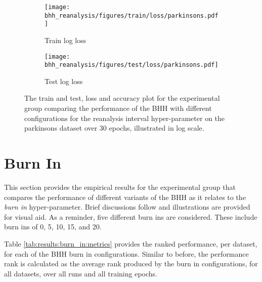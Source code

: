\begin{figure}[H]
	\begin{subfigure}{0.5\textwidth}
		\centering
		\texttt{[image: bhh\_reanalysis/figures/train/loss/parkinsons.pdf]}
		\caption{Train log loss}
		\label{fig:results:reanalysis:figures:loss:train:parkinsons}
	\end{subfigure}
	\begin{subfigure}{0.5\textwidth}
		\centering
		\texttt{[image: bhh\_reanalysis/figures/test/loss/parkinsons.pdf]}
		\caption{Test log loss}
		\label{fig:results:reanalysis:figures:loss:test:parkinsons}
	\end{subfigure}
	\par\bigskip
	\caption{The train and test, loss and accuracy plot for the experimental group comparing the performance of the \acs{BHH} with different configurations for the reanalysis interval hyper-parameter on the parkinsons dataset over 30 epochs, illustrated in log scale.}
	\label{fig:results:reanalysis:figures:parkinsons}
\end{figure}


\section{Burn In}\label{sec:results:burn_in}

This section provides the empirical results for the experimental group that compares the performance of different variants of the \acs{BHH} as it relates to the \textit{burn in} hyper-parameter. Brief discussions follow and illustrations are provided for visual aid. As a reminder, five different burn ins are considered. These include burn ins of 0, 5, 10, 15, and 20.

Table \ref{tab:results:burn_in:metrics} provides the ranked performance, per dataset, for each of the \acs{BHH} burn in configurations. Similar to before, the performance rank is calculated as the average rank produced by the burn in configurations, for all datasets, over all runs and all training epochs.

